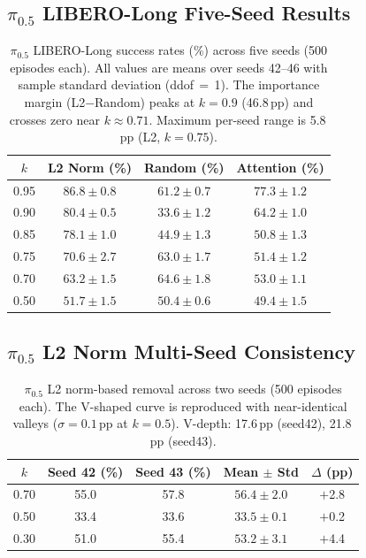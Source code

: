 \subsection{$\pi_{0.5}$ LIBERO-Long Five-Seed Results}
\label{app:pi05_long_multiseed}

\begin{table}[ht]
\centering
\small
\caption{$\pi_{0.5}$ LIBERO-Long success rates (\%) across five seeds (500 episodes each). All values are means over seeds 42--46 with sample standard deviation (ddof$\,{=}\,$1). The importance margin (L2$-$Random) peaks at $k{=}0.9$ (46.8\,pp) and crosses zero near $k{\approx}0.71$. Maximum per-seed range is 5.8\,pp (L2, $k{=}0.75$).}
\label{tab:pi05_long_multiseed}
\begin{tabular}{cccc}
\toprule
$k$ & L2 Norm (\%) & Random (\%) & Attention (\%) \\
\midrule
0.95 & $86.8 \pm 0.8$ & $61.2 \pm 0.7$ & $77.3 \pm 1.2$ \\
0.90 & $80.4 \pm 0.5$ & $33.6 \pm 1.2$ & $64.2 \pm 1.0$ \\
0.85 & $78.1 \pm 1.0$ & $44.9 \pm 1.3$ & $50.8 \pm 1.3$ \\
0.75 & $70.6 \pm 2.7$ & $63.0 \pm 1.7$ & $51.4 \pm 1.2$ \\
0.70 & $63.2 \pm 1.5$ & $64.6 \pm 1.8$ & $53.0 \pm 1.1$ \\
0.50 & $51.7 \pm 1.5$ & $50.4 \pm 0.6$ & $49.4 \pm 1.5$ \\
\bottomrule
\end{tabular}
\end{table}

\subsection{$\pi_{0.5}$ L2 Norm Multi-Seed Consistency}
\label{app:pi05_multiseed}

\begin{table}[ht]
\centering
\small
\caption{$\pi_{0.5}$ L2 norm-based removal across two seeds (500 episodes each). The V-shaped curve is reproduced with near-identical valleys ($\sigma{=}0.1$\,pp at $k{=}0.5$). V-depth: 17.6\,pp (seed42), 21.8\,pp (seed43).}
\label{tab:pi05_l2_multiseed}
\begin{tabular}{ccccc}
\toprule
$k$ & Seed 42 (\%) & Seed 43 (\%) & Mean $\pm$ Std & $\Delta$ (pp) \\
\midrule
0.70 & 55.0 & 57.8 & $56.4 \pm 2.0$ & $+$2.8 \\
0.50 & 33.4 & 33.6 & $33.5 \pm 0.1$ & $+$0.2 \\
0.30 & 51.0 & 55.4 & $53.2 \pm 3.1$ & $+$4.4 \\
\bottomrule
\end{tabular}
\end{table}


